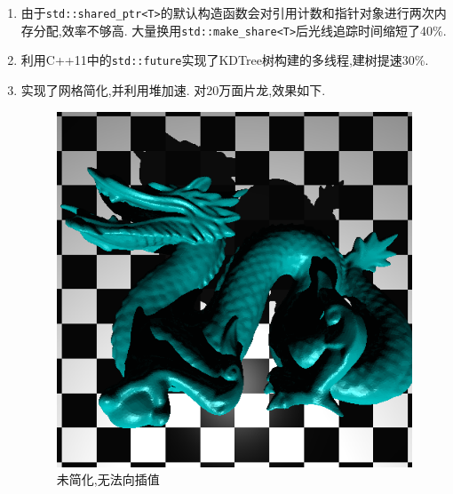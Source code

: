 \begin{enumerate}
  \item 由于\verb|std::shared_ptr<T>|的默认构造函数会对引用计数和指针对象进行两次内存分配,效率不够高.
    大量换用\verb|std::make_share<T>|后光线追踪时间缩短了40\%.

  \item 利用C++11中的\verb|std::future|实现了KDTree树构建的多线程,建树提速30\%.

  \item 实现了网格简化,并利用堆加速. 对20万面片龙,效果如下.
    \begin{figure}[H]
      \begin{minipage}[b]{0.46\linewidth}
        \centering
        \includegraphics[width=\textwidth]{img/unsimplified_nosmooth.png}
        \caption*{未简化,无法向插值}
      \end{minipage}
      \begin{minipage}[b]{0.46\linewidth}
        \centering

\end{minipage}
\end{figure}
\end{enumerate}

